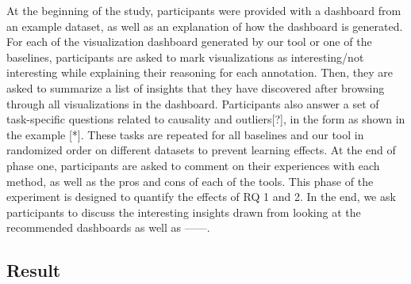 \par At the beginning of the study, participants were provided with a dashboard from an example dataset, as well as an explanation of how the dashboard is generated. For each of the visualization dashboard generated by our tool or one of the baselines, participants are asked to mark visualizations as interesting/not interesting while explaining their reasoning for each annotation. Then, they are asked to summarize a list of insights that they have discovered after browsing through all visualizations in the dashboard. Participants also answer a set of task-specific questions related to causality and outliers[?], in the form as shown in the example [*]. These tasks are repeated for all baselines and our tool in randomized order on different datasets to prevent learning effects. At the end of phase one, participants are asked to comment on their experiences with each method, as well as the pros and cons of each of the tools. This phase of the experiment is designed to quantify the effects of RQ 1 and 2. In the end, we ask participants to discuss the interesting insights drawn from looking at the recommended dashboards as well as  ------. 
\subsection{Result}